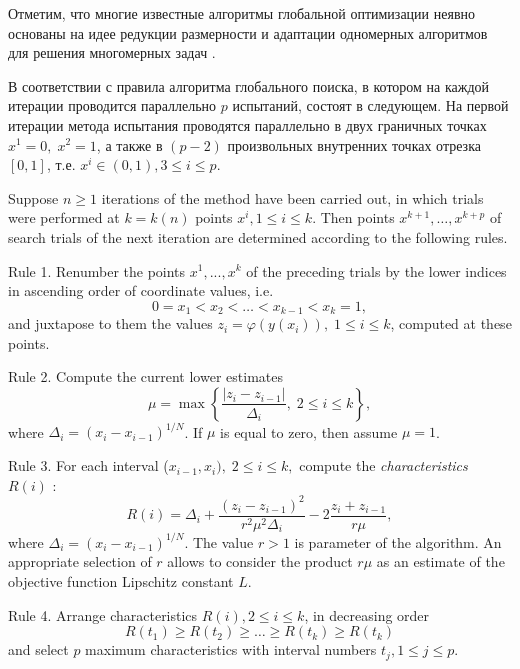 \documentclass{svproc}
\begin{document}
Отметим, что многие известные алгоритмы глобальной оптимизации неявно основаны на идее редукции размерности и адаптации одномерных алгоритмов для решения многомерных задач \cite{Sergeyev2006,Zilinskas2008,Evtushenko2013}.

В соответствии с \cite{Strongin2000,Strongin2018} правила алгоритма глобального поиска, в котором на каждой итерации проводится параллельно $p$ испытаний, состоят в следующем.
На первой итерации метода испытания проводятся параллельно в двух граничных точках $x^1 = 0, \; x^2 = 1$, а также в $(p-2)$ произвольных внутренних точках отрезка $[0,1]$, т.е. $x^i\in(0,1),3\leq i \leq p$.

Suppose $n\geq 1$  iterations of the method have been carried out, in which trials were performed at $k=k(n)$ points $x^i,1\leq i \leq k$. Then points $x^{k+1},\dots,x^{k+p}$  of search trials of the next iteration are determined according to the following rules.

Rule 1. Renumber the points $x^1,...,x^k$ of the preceding trials by the
lower indices in ascending order of coordinate values, i.e.
\[
0=x_1<x_2<\dots <x_{k-1} <x_k=1,
\]
and juxtapose to them the values $z_i=\varphi(y(x_i)), \; 1 \leq i \leq k$, computed at these points.

Rule 2. Compute the current lower estimates
\begin{equation}\label{Rule_Mu}
\mu = \max\left\{ \frac{\left|z_i-z_{i-1}\right|}{ \Delta_i },\; 2 \leq i \leq k  \right\},
\end{equation}
where $\Delta_i = (x_i-x_{i-1})^{1/N}$. If $\mu$ is equal to zero, then assume $\mu = 1$.

Rule 3. For each interval ($x_{i-1},x_i), \; 2 \leq i \leq k,$ compute
the \textit{characteristics} $R(i)$ :
\begin{equation}\label{Rule_R}
R(i)=\Delta_i+\frac{(z_i-z_{i-1})^2}{r^2 \mu^2\Delta_i}-2\frac{z_i+z_{i-1}}{r \mu},
\end{equation}
where $\Delta_i=(x_i-x_{i-1})^{1/N}$. The value $r > 1$ is parameter of the algorithm. An appropriate selection
of $r$ allows to consider the product $r \mu$ as an estimate
of the objective function Lipschitz constant $L$.

Rule 4. Arrange characteristics  $R(i), 2 \leq i \leq k$, in decreasing order 
\begin{equation}\label{Rule_Max}
R(t_1)\geq R(t_2)\geq \dots \geq R(t_{k}) \geq R(t_{k})
\end{equation}
and select $p$ maximum characteristics with interval numbers $t_j, 1\leq j \leq p$.
\end{document}
